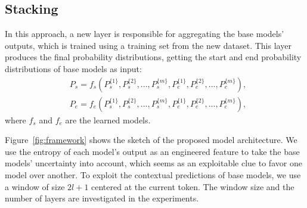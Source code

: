 \documentclass[review]{elsarticle}
\begin{document}
\subsection{Stacking}
In this approach, a new layer is responsible for aggregating the base models' outputs, which is trained using a training set from the new dataset. This layer produces the final probability distributions, getting the start and end probability distributions of base models as input:
\begin{equation}\label{eq:stacking}  
\begin{aligned}
&P_{s}=f_s(P^{\{1\}}_{s},P^{\{2\}}_{s},...,P^{\{m\}}_{s},P^{\{1\}}_{e},P^{\{2\}}_{e},...,P^{\{m\}}_{e}),\\
&P_{e}=f_e(P^{\{1\}}_{s},P^{\{2\}}_{s},...,P^{\{m\}}_{s},P^{\{1\}}_{e},P^{\{2\}}_{e},...,P^{\{m\}}_{e}),
\end{aligned}
\end{equation}
where $f_s$ and $f_e$ are the learned models. 

Figure~\ref{fig:framework} shows the sketch of the proposed model architecture. We use the entropy of each model's output as an engineered feature to take the base models' uncertainty into account, which seems as an exploitable clue to favor one model over another. To exploit the contextual predictions of base models, we use a window of size $2l+1$ centered at the current token. The window size and the number of layers are investigated in the experiments. 
\end{document}
